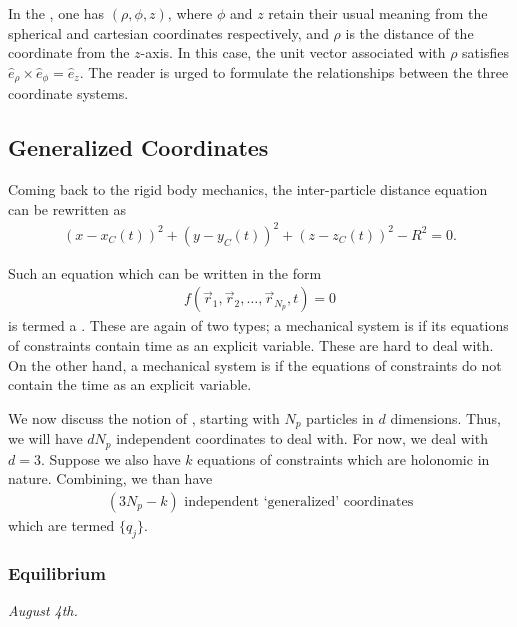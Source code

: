 In the , one has $(\rho,\phi,z)$, where $\phi$ and $z$ retain their usual meaning from the spherical and cartesian coordinates respectively, and $\rho$ is the distance of the coordinate from the $z$-axis. In this case, the unit vector associated with $\rho$ satisfies $\hat{e}_{\rho} \times \hat{e}_{\phi} = \hat{e}_{z}$. The reader is urged to formulate the relationships between the three coordinate systems.

\subsection{Generalized Coordinates}

Coming back to the rigid body mechanics, the inter-particle distance equation can be rewritten as
\begin{align}
    (x-x_{C}(t))^{2} + (y-y_{C}(t))^{2} + (z-z_{C}(t))^{2} - R^{2} = 0.
\end{align}

Such an equation which can be written in the form
\begin{align}
    f(\vec{r}_{1},\vec{r}_{2},\ldots,\vec{r}_{N_{p}},t) = 0
\end{align}
is termed a . These are again of two types; a mechanical system is  if its equations of constraints contain time as an explicit variable. These are hard to deal with. On the other hand, a mechanical system is  if the equations of constraints do not contain the time as an explicit variable.

We now discuss the notion of , starting with $N_{p}$ particles in $d$ dimensions. Thus, we will have $dN_{p}$ independent coordinates to deal with. For now, we deal with $d = 3$. Suppose we also have $k$ equations of constraints which are holonomic in nature. Combining, we than have
\begin{align}
    (3N_{p}-k) \text{ independent `generalized' coordinates}
\end{align}
which are termed $\{q_{j}\}$.

\subsubsection{Equilibrium}
\textit{August 4th.}

